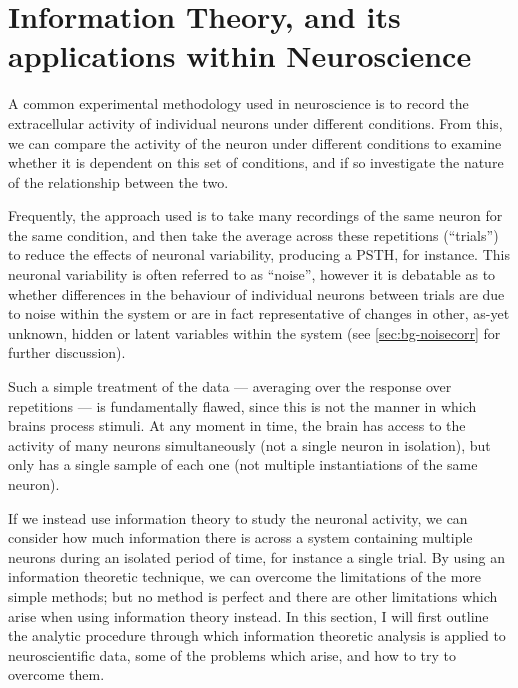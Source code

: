 
\section{Information Theory, and its applications within Neuroscience}
\label{sec:bgit}

A common experimental methodology used in neuroscience is to record the extracellular activity of individual neurons under different conditions.
From this, we can compare the activity of the neuron under different conditions to examine whether it is dependent on this set of conditions, and if so investigate the nature of the relationship between the two.

Frequently, the approach used is to take many recordings of the same neuron for the same condition, and then take the average across these repetitions (``trials'') to reduce the effects of neuronal variability, producing a \ac{PSTH}, for instance.
This neuronal variability is often referred to as ``noise'', however it is debatable as to whether differences in the behaviour of individual neurons between trials are due to noise within the system or are in fact representative of changes in other, as-yet unknown, hidden or latent variables within the system (see \autoref{sec:bg-noisecorr} for further discussion).

Such a simple treatment of the data --- averaging over the response over repetitions --- is fundamentally flawed, since this is not the manner in which brains process stimuli.
At any moment in time, the brain has access to the activity of many neurons simultaneously (not a single neuron in isolation), but only has a single sample of each one (not multiple instantiations of the same neuron).

If we instead use information theory to study the neuronal activity, we can consider how much information there is across a system containing multiple neurons during an isolated period of time, for instance a single trial.
By using an information theoretic technique, we can overcome the limitations of the more simple methods; but no method is perfect and there are other limitations which arise when using information theory instead.
In this section, I will first outline the analytic procedure through which information theoretic analysis is applied to neuroscientific data, some of the problems which arise, and how to try to overcome them.


